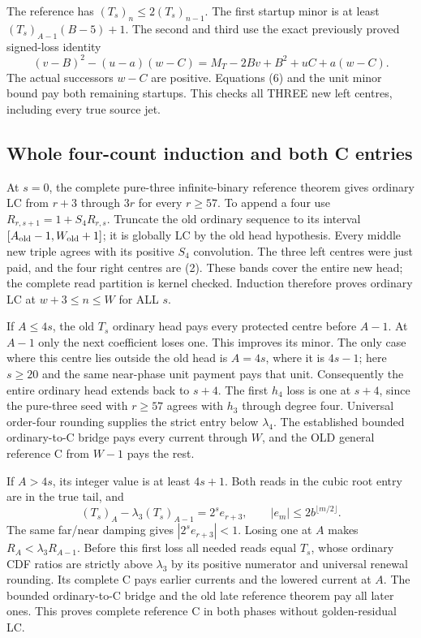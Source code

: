 The reference has $(T_s)_n\le2(T_s)_{n-1}$. The first startup
minor is at least $(T_s)_{A-1}(B-5)+1$. The second and third use
the exact previously proved signed-loss identity
\[
 (v-B)^2-(u-a)(w-C)
 =M_T-2Bv+B^2+uC+a(w-C).
\]
The actual successors $w-C$ are positive. Equations (6) and the
unit minor bound pay both remaining startups. This checks all
THREE new left centres, including every true source jet.

\subsection{Whole four-count induction and both C entries}
At $s=0$, the complete pure-three infinite-binary reference theorem
gives ordinary LC from $r+3$ through $3r$ for every $r\ge57$.
To append a four use $R_{r,s+1}=1+S_4R_{r,s}$.
Truncate the old ordinary sequence to its interval
$[A_{\rm old}-1,W_{\rm old}+1]$; it is globally LC by the old
head hypothesis. Every middle new triple agrees with its positive
$S_4$ convolution. The three left centres were just paid, and the
four right centres are (2). These bands cover the entire new head;
the complete read partition is kernel checked. Induction therefore
proves ordinary LC at $w+3\le n\le W$ for ALL $s$.

If $A\le4s$, the old $T_s$ ordinary head pays every protected
centre before $A-1$. At $A-1$ only the next coefficient loses one.
This improves its minor. The only case where this centre lies
outside the old head is $A=4s$, where it is $4s-1$; here
$s\ge20$ and the same near-phase unit payment pays that unit.
Consequently the entire ordinary head extends back to $s+4$.
The first $h_4$ loss is one at $s+4$, since the pure-three seed
with $r\ge57$ agrees with $h_3$ through degree four. Universal
order-four rounding supplies the strict entry below $\lambda_4$.
The established bounded ordinary-to-C bridge pays every current
through $W$, and the OLD general reference C from $W-1$ pays the rest.

If $A>4s$, its integer value is at least $4s+1$. Both reads in
the cubic root entry are in the true tail, and
\[
 (T_s)_A-\lambda_3(T_s)_{A-1}=2^s e_{r+3},
 \qquad |e_m|\le2b^{\lfloor m/2\rfloor}.
\]
The same far/near damping gives $|2^s e_{r+3}|<1$.
Losing one at $A$ makes $R_A<\lambda_3R_{A-1}$.
Before this first loss all needed reads equal $T_s$, whose ordinary
CDF ratios are strictly above $\lambda_3$ by its positive numerator
and universal renewal rounding. Its complete C pays earlier currents
and the lowered current at $A$. The bounded ordinary-to-C bridge
and the old late reference theorem pay all later ones.
This proves complete reference C in both phases without golden-residual LC.

